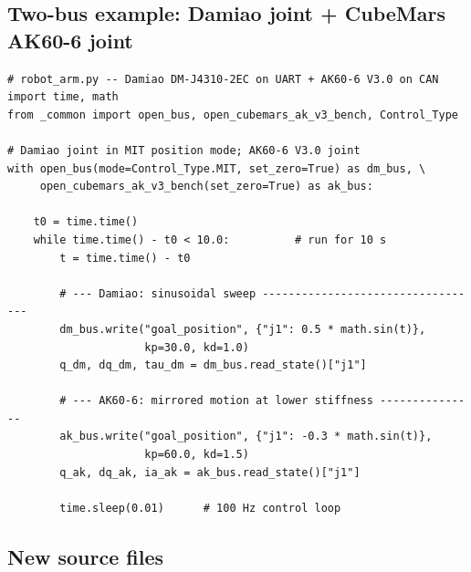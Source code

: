 \documentclass[11pt,a4paper]{article}
\begin{document}
\subsection{Two-bus example: Damiao joint + CubeMars AK60-6 joint}

\begin{lstlisting}
# robot_arm.py -- Damiao DM-J4310-2EC on UART + AK60-6 V3.0 on CAN
import time, math
from _common import open_bus, open_cubemars_ak_v3_bench, Control_Type

# Damiao joint in MIT position mode; AK60-6 V3.0 joint
with open_bus(mode=Control_Type.MIT, set_zero=True) as dm_bus, \
     open_cubemars_ak_v3_bench(set_zero=True) as ak_bus:

    t0 = time.time()
    while time.time() - t0 < 10.0:          # run for 10 s
        t = time.time() - t0

        # --- Damiao: sinusoidal sweep ----------------------------------
        dm_bus.write("goal_position", {"j1": 0.5 * math.sin(t)},
                     kp=30.0, kd=1.0)
        q_dm, dq_dm, tau_dm = dm_bus.read_state()["j1"]

        # --- AK60-6: mirrored motion at lower stiffness ---------------
        ak_bus.write("goal_position", {"j1": -0.3 * math.sin(t)},
                     kp=60.0, kd=1.5)
        q_ak, dq_ak, ia_ak = ak_bus.read_state()["j1"]

        time.sleep(0.01)      # 100 Hz control loop
\end{lstlisting}

\subsection{New source files}
\end{document}
